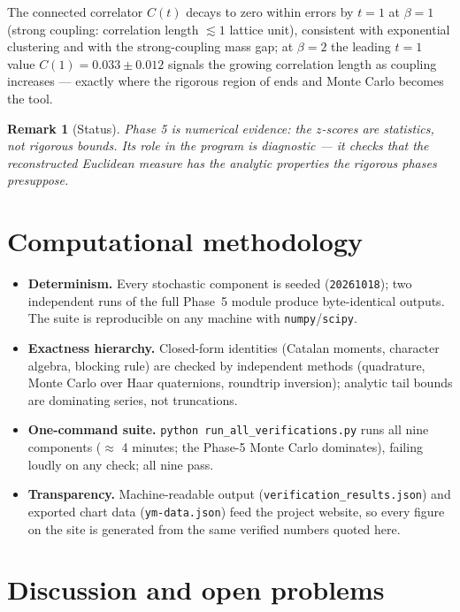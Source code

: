 \documentclass[11pt,a4paper]{article}
\newtheorem{remark}[theorem]{Remark}
\begin{document}
The connected correlator $C(t)$ decays to zero within errors by $t = 1$
at $\beta = 1$ (strong coupling: correlation length $\lesssim 1$ lattice
unit), consistent with exponential clustering and with the
strong-coupling mass gap; at $\beta = 2$ the leading $t = 1$ value
$C(1) = 0.033 \pm 0.012$ signals the growing correlation length as
coupling increases --- exactly where the rigorous region of
 ends and Monte Carlo becomes the tool.

\begin{remark}[Status]
Phase 5 is \emph{numerical evidence}: the $z$-scores are statistics, not
rigorous bounds.  Its role in the program is diagnostic --- it checks that
the reconstructed Euclidean measure has the analytic properties the
rigorous phases presuppose.
\end{remark}

\section{Computational methodology}
\label{sec:methodology}

\begin{itemize}[leftmargin=1.5em]
  \item \textbf{Determinism.}  Every stochastic component is seeded
    (\texttt{20261018}); two independent runs of the full Phase~5 module
    produce byte-identical outputs.  The suite is reproducible on any
    machine with \texttt{numpy}/\texttt{scipy}.
  \item \textbf{Exactness hierarchy.}  Closed-form identities (Catalan
    moments, character algebra, blocking rule) are checked by independent
    methods (quadrature, Monte Carlo over Haar quaternions, roundtrip
    inversion); analytic tail bounds are dominating series, not
    truncations.
  \item \textbf{One-command suite.}  \texttt{python run\_all\_verifications.py}
    runs all nine components ($\approx$ 4 minutes; the Phase-5 Monte Carlo
    dominates), failing loudly on any check; all nine pass.
  \item \textbf{Transparency.}  Machine-readable output
    (\texttt{verification\_results.json}) and exported chart data
    (\texttt{ym-data.json}) feed the project website, so every figure on
    the site is generated from the same verified numbers quoted here.
\end{itemize}

\section{Discussion and open problems}
\label{sec:discussion}
\end{document}
